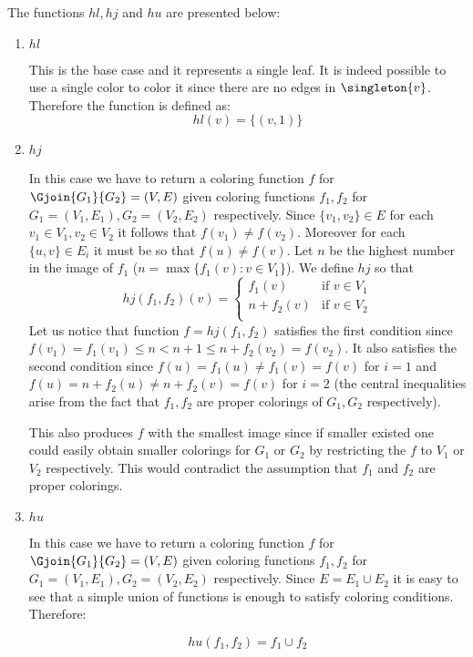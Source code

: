 The functions $hl, hj$ and $hu$ are presented below:
\begin{enumerate}
    \item $hl$

          This is the base case and it represents a single leaf. It is indeed possible to use a single color to color it since there are no edges in $\singleton{v}$. Therefore the function is defined as:
          \[
              hl(v) = \{(v,1)\}
          \]

    \item $hj$

          In this case we have to return a coloring function $f$ for $\Gjoin{G_1}{G_2} = (V,E)$ given coloring functions $f_1,f_2$ for $G_1 = (V_1, E_1), G_2 = (V_2, E_2)$ respectively. Since $\{v_1, v_2\} \in E$ for each $v_1 \in V_1, v_2 \in V_2$ it follows that $f(v_1) \neq f(v_2)$. Moreover for each $\{u,v\} \in E_i$ it must be so that $f(u) \neq f(v)$. Let $n$ be the highest number in the image of $f_1$ ($n = \max\{f_1(v) : v \in V_1\}$). We define $hj$ so that
          \[
              hj(f_1, f_2)(v) = \begin{cases}
                  f_1(v)     & \text{if } v \in V_1 \\
                  n + f_2(v) & \text{if } v \in V_2 \\
              \end{cases}
          \]
          Let us notice that function $f = hj(f_1, f_2)$ satisfies the first condition since $f(v_1) = f_1(v_1) \leq n < n+1 \leq n + f_2(v_2) = f(v_2)$. It also satisfies the second condition since $f(u) = f_1(u) \neq f_1(v) = f(v)$ for $i = 1$ and $f(u) = n + f_2(u) \neq n + f_2(v) = f(v)$ for $i = 2$ (the central inequalities arise from the fact that $f_1, f_2$ are proper colorings of $G_1, G_2$ respectively).

          This also produces $f$ with the smallest image since if smaller existed one could easily obtain smaller colorings for $G_1$ or $G_2$ by restricting the $f$ to $V_1$ or $V_2$ respectively. This would contradict the assumption that $f_1$ and $f_2$ are proper colorings.


    \item $hu$

          In this case we have to return a coloring function $f$ for $\Gjoin{G_1}{G_2} = (V,E)$ given coloring functions $f_1,f_2$ for $G_1 = (V_1, E_1), G_2 = (V_2, E_2)$ respectively. Since $E = E_1 \cup E_2$ it is easy to see that a simple union of functions is enough to satisfy coloring conditions. Therefore:

          \[
              hu(f_1, f_2) = f_1 \cup f_2
          \]
\end{enumerate}


